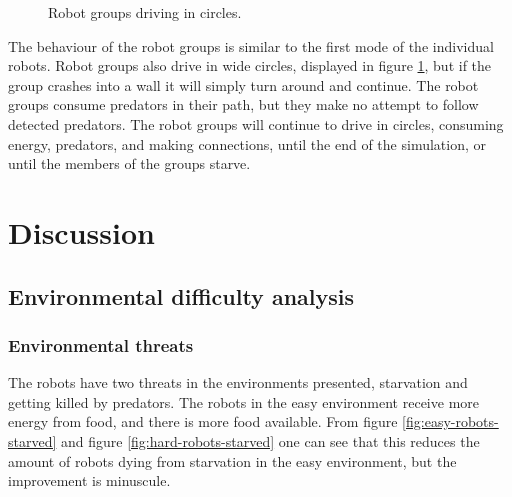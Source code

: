 \begin{figure}[H]
	
	\centering
	\caption{Robot groups driving in circles.}
	\label{fig:group-circles}
\end{figure}

The behaviour of the robot groups is similar to the first mode of the individual robots.
Robot groups also drive in wide circles, displayed in figure \ref{fig:group-circles}, but if the group crashes into a wall it will simply turn around and continue.
The robot groups consume predators in their path, but they make no attempt to follow detected predators.
The robot groups will continue to drive in circles, consuming energy, predators, and making connections, until the end of the simulation, or until the members of the groups starve.



\section{Discussion}

\subsection{Environmental difficulty analysis}
\subsubsection{Environmental threats}
The robots have two threats in the environments presented, starvation and getting killed by predators.
The robots in the easy environment receive more energy from food, and there is more food available.
From figure \ref{fig:easy-robots-starved} and figure \ref{fig:hard-robots-starved} one can see that this reduces the amount of robots dying from starvation in the easy environment, but the improvement is minuscule.

